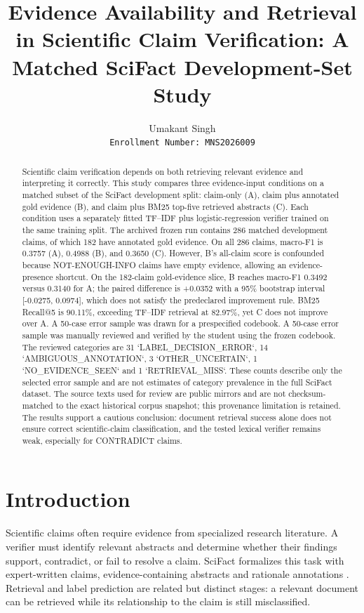 \documentclass[10pt]{article}
\title{Evidence Availability and Retrieval in Scientific Claim Verification: A Matched SciFact Development-Set Study}\hypersetup{pdftitle={Evidence Availability and Retrieval in Scientific Claim Verification: A Matched SciFact Development-Set Study},pdfauthor={Umakant Singh}}
\author{Umakant Singh\\\texttt{Enrollment Number: MNS2026009}}
\date{}
\begin{document}
\maketitle
\begin{abstract}
Scientific claim verification depends on both retrieving relevant evidence and interpreting it correctly. This study compares three evidence-input conditions on a matched subset of the SciFact development split: claim-only (A), claim plus annotated gold evidence (B), and claim plus BM25 top-five retrieved abstracts (C). Each condition uses a separately fitted TF--IDF plus logistic-regression verifier trained on the same training split. The archived frozen run contains 286 matched development claims, of which 182 have annotated gold evidence. On all 286 claims, macro-F1 is 0.3757 (A), 0.4988 (B), and 0.3650 (C). However, B's all-claim score is confounded because NOT-ENOUGH-INFO claims have empty evidence, allowing an evidence-presence shortcut. On the 182-claim gold-evidence slice, B reaches macro-F1 0.3492 versus 0.3140 for A; the paired difference is +0.0352 with a 95\% bootstrap interval [-0.0275, 0.0974], which does not satisfy the predeclared improvement rule. BM25 Recall@5 is 90.11\%, exceeding TF--IDF retrieval at 82.97\%, yet C does not improve over A. A 50-case error sample was drawn for a prespecified codebook. A 50-case error sample was manually reviewed and verified by the student using the frozen codebook. The reviewed categories are 31 `LABEL_DECISION_ERROR`, 14 `AMBIGUOUS_ANNOTATION`, 3 `OTHER_UNCERTAIN`, 1 `NO_EVIDENCE_SEEN` and 1 `RETRIEVAL_MISS`. These counts describe only the selected error sample and are not estimates of category prevalence in the full SciFact dataset. The source texts used for review are public mirrors and are not checksum-matched to the exact historical corpus snapshot; this provenance limitation is retained. The results support a cautious conclusion: document retrieval success alone does not ensure correct scientific-claim classification, and the tested lexical verifier remains weak, especially for CONTRADICT claims.
\end{abstract}

\section{Introduction}
Scientific claims often require evidence from specialized research literature. A verifier must identify relevant abstracts and determine whether their findings support, contradict, or fail to resolve a claim. SciFact formalizes this task with expert-written claims, evidence-containing abstracts and rationale annotations \citep{wadden2020fact}. Retrieval and label prediction are related but distinct stages: a relevant document can be retrieved while its relationship to the claim is still misclassified.
\end{document}
